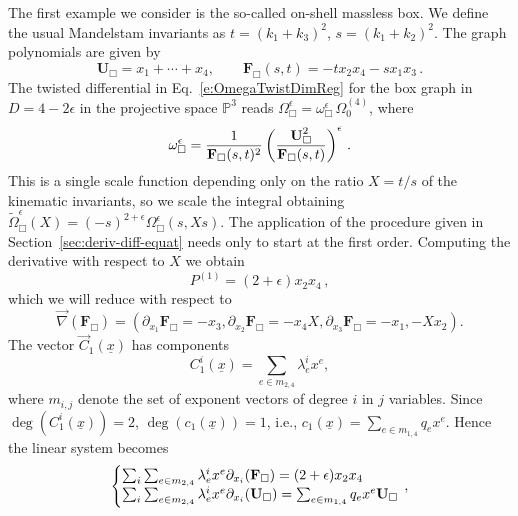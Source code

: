 \documentclass[a4paper,12pt]{article}
\numberwithin{equation}{section}
\numberwithin{figure}{section}
\begin{document}
The first example we consider is the so-called on-shell massless box. We define the usual Mandelstam invariants as $t=(k_1+k_3)^2$, $s=(k_1+k_2)^2$.  The graph polynomials are given by
\begin{equation}
	\label{e:Boxgraphpolynomials}
	\textbf{U}_{\Box}=x_1+\cdots +x_4,\qquad
	\textbf{F}_{\Box}(s,t)=-t x_2x_4-sx_1x_3 \, .
\end{equation}
The twisted differential in Eq.~\eqref{e:OmegaTwistDimReg} for the box
graph in $D=4-2\epsilon$ in the projective
space $\mathbb P^3$ reads $\Omega_\Box^\epsilon= \omega_\Box^\epsilon
\,\Omega_0^{(4)}$, where
\begin{equation}\label{e:OmegaBox}
	\omega_\Box^\epsilon=   {1\over \textbf{F}_{\Box}(s,t)^2
	}\left(\textbf{U}_{\Box}^2\over \textbf{F}_{\Box}(s,t)\right)^\epsilon \, .
\end{equation}
This is a single scale function depending only on the ratio
$X=t/s$ of the kinematic invariants, so we scale the integral obtaining
$\tilde \Omega_\Box^\epsilon(X)=(-s)^{2+\epsilon} \Omega_\Box^\epsilon(s,X s)$.
%
The application of the procedure given in
Section~\ref{sec:deriv-diff-equat} needs only to start at the first
order. Computing the derivative with respect to $X$ we obtain 
%
\begin{equation}
P  ^{(1)}= (2+\epsilon) x_2 x_4 \, , 
\end{equation}
which we will reduce with respect to
\begin{equation}\vec\nabla(\mathbf F_\Box)=\left(
    \partial_{x_1}\textbf{F}_\Box=-x_3, \partial_{x_2}\textbf{F}_\Box=
    -x_4 X, \partial_{x_3}\textbf{F}_\Box=-x_1, -X x_2  \right).
\end{equation}
The  vector  $\vec C_{1}(\underline x)$ has components 
\begin{equation}
C^i_{1}(\underline x)= \sum_{e \in m_{2,4}} \lambda^i_e x^e,	
\end{equation}
where $m_{i,j}$ denote the set of exponent vectors of degree $i$ in $j$ variables. Since $\deg(C^i_{1}(\underline x))=2$, $\deg (c_1(\underline x))=1$, i.e., $c_1(\underline x)=\sum_{e\in m_{1,4}} q_e x^e$. Hence the linear system becomes
%
\begin{equation}\label{e:sysCFU-Box}
	\left\{\begin{array}{@{}l@{}}
\sum_i \sum_{e \in m_{2,4}} \lambda^i_e x^e \partial_{x_i}(\mathbf F_\Box) 
		=    (2+\epsilon) x_2 x_4\\
\sum_i\sum_{e \in m_{2,4}} \lambda^i_e x^e \partial_{x_i}(\mathbf U_\Box) = \sum_{e\in m_{1,4}} q_e x^e \textbf{U}_\Box 
	\end{array}\right.\,,
\end{equation}
\end{document}
